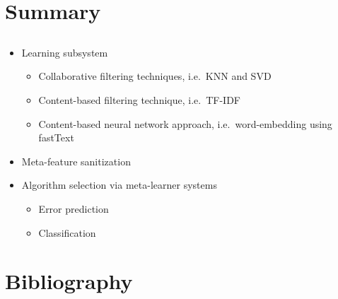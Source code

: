 \documentclass[aspectratio=169]{beamer}
\begin{document}
\section*{Summary}
\subsection{\inserttitle}
\begin{frame}
	\frametitle{\insertsection}
	\framesubtitle{\insertsubsection}

	\begin{itemize}
		\item Learning subsystem
		\begin{itemize}
			\item Collaborative filtering techniques, i.e.~KNN and SVD
			\item Content-based filtering technique, i.e.~TF-IDF
			\item Content-based neural network approach, i.e.~word-embedding using fastText
		\end{itemize}
		\item Meta-feature sanitization
		\item Algorithm selection via meta-learner systems
		\begin{itemize}
			\item Error prediction
			\item Classification
		\end{itemize}
	\end{itemize}
\end{frame}

\appendix

\section*{Bibliography}
\begin{frame}[shrink=20]
	\frametitle{\insertsection}

	\printbibliography%
\end{frame}
\end{document}
